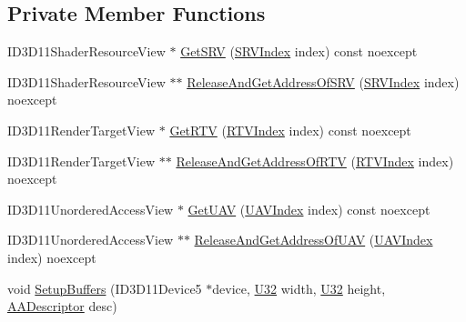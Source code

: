 \subsection*{Private Member Functions}
\begin{DoxyCompactItemize}
\item 
I\+D3\+D11\+Shader\+Resource\+View $\ast$ \hyperlink{classmage_1_1_rendering_output_manager_adbccd7240023dd803ce7764e6d4e3298}{Get\+S\+RV} (\hyperlink{classmage_1_1_rendering_output_manager_ab23ee4985ed0d176479fe796dc3a4cfd}{S\+R\+V\+Index} index) const noexcept
\item 
I\+D3\+D11\+Shader\+Resource\+View $\ast$$\ast$ \hyperlink{classmage_1_1_rendering_output_manager_ab6b8045718c2dbfc8b64c23d220a2288}{Release\+And\+Get\+Address\+Of\+S\+RV} (\hyperlink{classmage_1_1_rendering_output_manager_ab23ee4985ed0d176479fe796dc3a4cfd}{S\+R\+V\+Index} index) noexcept
\item 
I\+D3\+D11\+Render\+Target\+View $\ast$ \hyperlink{classmage_1_1_rendering_output_manager_a367665fe249f8dd373ae48f4f6c731bd}{Get\+R\+TV} (\hyperlink{classmage_1_1_rendering_output_manager_a776a03191e0a424d8e014414d9d44cef}{R\+T\+V\+Index} index) const noexcept
\item 
I\+D3\+D11\+Render\+Target\+View $\ast$$\ast$ \hyperlink{classmage_1_1_rendering_output_manager_a1b8102ba96cdab743499da051ca4fa3f}{Release\+And\+Get\+Address\+Of\+R\+TV} (\hyperlink{classmage_1_1_rendering_output_manager_a776a03191e0a424d8e014414d9d44cef}{R\+T\+V\+Index} index) noexcept
\item 
I\+D3\+D11\+Unordered\+Access\+View $\ast$ \hyperlink{classmage_1_1_rendering_output_manager_a69f782de38807401a5ee6ab4d47a928c}{Get\+U\+AV} (\hyperlink{classmage_1_1_rendering_output_manager_a222cae54b40bbb153da0dfa840a37fdb}{U\+A\+V\+Index} index) const noexcept
\item 
I\+D3\+D11\+Unordered\+Access\+View $\ast$$\ast$ \hyperlink{classmage_1_1_rendering_output_manager_acd5d6a8feb5a7d9aa41667be0cef617b}{Release\+And\+Get\+Address\+Of\+U\+AV} (\hyperlink{classmage_1_1_rendering_output_manager_a222cae54b40bbb153da0dfa840a37fdb}{U\+A\+V\+Index} index) noexcept
\item 
void \hyperlink{classmage_1_1_rendering_output_manager_afea7686ac1181f180c23fe65930a9eba}{Setup\+Buffers} (I\+D3\+D11\+Device5 $\ast$device, \hyperlink{namespacemage_a41c104c036fba3756a74e19f793eeaa1}{U32} width, \hyperlink{namespacemage_a41c104c036fba3756a74e19f793eeaa1}{U32} height, \hyperlink{namespacemage_a0b400065340fa5cca0ce4c2809d91af1}{A\+A\+Descriptor} desc)
$$
\end{DoxyCompactItemize}
